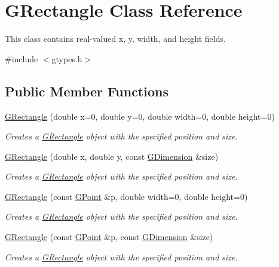 \hypertarget{classGRectangle}{}\section{G\+Rectangle Class Reference}
\label{classGRectangle}


This class contains real-\/valued x, y, width, and height fields.  




{\ttfamily \#include $<$gtypes.\+h$>$}

\subsection*{Public Member Functions}
\begin{DoxyCompactItemize}
\item 
\mbox{\hyperlink{classGRectangle_a3e31a47f01a0e643b572a11b46ce9f69}{G\+Rectangle}} (double x=0, double y=0, double width=0, double height=0)
\begin{DoxyCompactList}\small\item\em Creates a {\ttfamily \mbox{\hyperlink{classGRectangle}{G\+Rectangle}}} object with the specified position and size. \end{DoxyCompactList}\item 
\mbox{\hyperlink{classGRectangle_abf6b4d32650748215930e562ffbfb220}{G\+Rectangle}} (double x, double y, const \mbox{\hyperlink{classGDimension}{G\+Dimension}} \&size)
\begin{DoxyCompactList}\small\item\em Creates a {\ttfamily \mbox{\hyperlink{classGRectangle}{G\+Rectangle}}} object with the specified position and size. \end{DoxyCompactList}\item 
\mbox{\hyperlink{classGRectangle_a68fa0886a48ee516b8897997c767e504}{G\+Rectangle}} (const \mbox{\hyperlink{classGPoint}{G\+Point}} \&p, double width=0, double height=0)
\begin{DoxyCompactList}\small\item\em Creates a {\ttfamily \mbox{\hyperlink{classGRectangle}{G\+Rectangle}}} object with the specified position and size. \end{DoxyCompactList}\item 
\mbox{\hyperlink{classGRectangle_a90356cb96943b1a130aa934f150265a7}{G\+Rectangle}} (const \mbox{\hyperlink{classGPoint}{G\+Point}} \&p, const \mbox{\hyperlink{classGDimension}{G\+Dimension}} \&size)
\begin{DoxyCompactList}\small\item\em Creates a {\ttfamily \mbox{\hyperlink{classGRectangle}{G\+Rectangle}}} object with the specified position and size. \end{DoxyCompactList}\item 

\end{DoxyCompactItemize}
